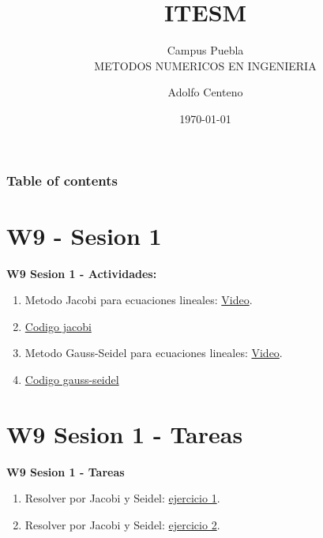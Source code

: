 \documentclass{beamer}
\begin{document}
\title{ITESM}  
\subtitle{Campus Puebla\\METODOS NUMERICOS EN INGENIERIA
}
\author{Adolfo Centeno}
\date{\today} 


\begin{frame}
\titlepage
\end{frame}

\begin{frame}\frametitle{Table of contents}
\tableofcontents
\end{frame} 


\section{W9 - Sesion 1 }

\begin{frame}

\textbf{W9 Sesion 1 - Actividades:}

\begin{enumerate}
\item
	Metodo Jacobi para ecuaciones lineales: \href{https://www.youtube.com/watch?v=TD83oN2LNdo}{Video}.	
\item
	\href{https://github.com/adsoftsito/metodos-numericos/blob/master/w9/jacobi/jacobi.pdf}{Codigo jacobi} 

\item
	Metodo Gauss-Seidel para ecuaciones lineales: \href{https://www.youtube.com/watch?v=abAe4418VdA&t=8s}{Video}.	
\item
	\href{https://github.com/adsoftsito/metodos-numericos/blob/master/w9/gauss-seidel/gauss_seidel.pdf}{Codigo gauss-seidel} 
	

\end{enumerate} 

\end{frame}


\section{W9 Sesion 1 - Tareas }

\begin{frame}


\textbf{W9 Sesion 1 - Tareas}


\begin{enumerate}
\item
	Resolver por Jacobi y Seidel: \href{https://www.youtube.com/watch?v=lEtDw4HUAmY&t=858s}{ejercicio 1}.	
\item
	Resolver por Jacobi y Seidel: \href{https://www.youtube.com/watch?v=k2dB1IVWTng}{ejercicio 2}.	

\end{enumerate} 


\end{frame}
\end{document}
